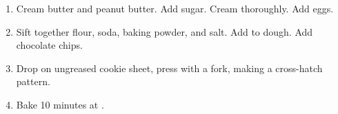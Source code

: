 
\begin{ingredients}
\end{ingredients}


\begin{recipe}
  \begin{enumerate}
  \item Cream butter and peanut butter.  Add sugar.  Cream thoroughly.
    Add eggs.

  \item Sift together flour, soda, baking powder, and salt.  Add to
    dough.  Add chocolate chips.

  \item Drop on ungreased cookie sheet, press with a fork, making a
    cross-hatch pattern.

  \item Bake 10 minutes at .

  \end{enumerate}
\end{recipe}
